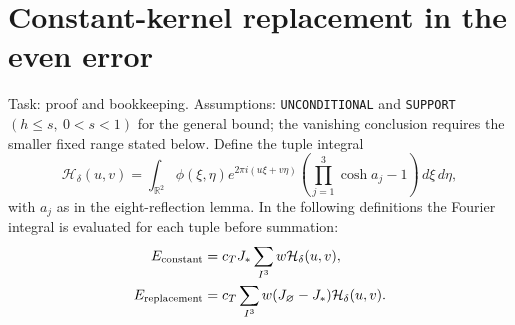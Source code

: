 \documentclass[11pt]{article}
\newcommand{\R}{\mathbb R}
\newcommand{\dd}{\,d}
\begin{document}
\section{Constant-kernel replacement in the even error}
Task: proof and bookkeeping. Assumptions: \texttt{UNCONDITIONAL} and
\texttt{SUPPORT}\,$(h\leq s,\ 0<s<1)$ for the general bound; the
vanishing conclusion requires the smaller fixed range stated below.
Define the tuple integral
\begin{equation}\label{eq:constant-tuple}
 \mathcal H_\delta(u,v)=\int_{\R^2}\phi(\xi,\eta)
 e^{2\pi i(u\xi+v\eta)}
 \left(\prod_{j=1}^3\cosh a_j-1\right)\dd\xi\dd\eta,
\end{equation}
with $a_j$ as in the eight-reflection lemma. In the following definitions
the Fourier integral is evaluated for each tuple before summation:
\begin{align}
 E_{\rm constant}&=c_TJ_*\sum_{I^3}w\mathcal H_\delta(u,v),\notag\\
 E_{\rm replacement}&=c_T\sum_{I^3}w(J_\varnothing-J_*)
                                      \mathcal H_\delta(u,v).
                                      \label{eq:constant-errors}
\end{align}
\end{document}
